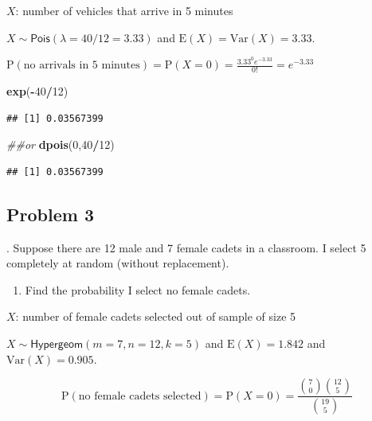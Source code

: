 \documentclass[
]{book}
\newenvironment{Shaded}{\begin{snugshade}}{\end{snugshade}}
\newcommand{\CommentTok}[1]{\textcolor[rgb]{0.56,0.35,0.01}{\textit{#1}}}
\newcommand{\DecValTok}[1]{\textcolor[rgb]{0.00,0.00,0.81}{#1}}
\newcommand{\KeywordTok}[1]{\textcolor[rgb]{0.13,0.29,0.53}{\textbf{#1}}}
\newcommand{\NormalTok}[1]{#1}
\newcommand{\OperatorTok}[1]{\textcolor[rgb]{0.81,0.36,0.00}{\textbf{#1}}}
\providecommand{\tightlist}{%
  \setlength{\itemsep}{0pt}\setlength{\parskip}{0pt}}
\begin{document}
\(X\): number of vehicles that arrive in 5 minutes

\(X\sim \textsf{Pois}(\lambda=40/12=3.33)\) and \(\mbox{E}(X)=\mbox{Var}(X)=3.33\).

\(\mbox{P}(\mbox{no arrivals in 5 minutes})=\mbox{P}(X=0)=\frac{3.33^0 e^{-3.33}}{0!}=e^{-3.33}\)

\begin{Shaded}
\begin{Highlighting}[]
\KeywordTok{exp}\NormalTok{(}\OperatorTok{-}\DecValTok{40}\OperatorTok{/}\DecValTok{12}\NormalTok{)}
\end{Highlighting}
\end{Shaded}

\begin{verbatim}
## [1] 0.03567399
\end{verbatim}

\begin{Shaded}
\begin{Highlighting}[]
\CommentTok{##or}
\KeywordTok{dpois}\NormalTok{(}\DecValTok{0}\NormalTok{,}\DecValTok{40}\OperatorTok{/}\DecValTok{12}\NormalTok{)}
\end{Highlighting}
\end{Shaded}

\begin{verbatim}
## [1] 0.03567399
\end{verbatim}

\newpage

\hypertarget{problem-3-7}{%
\subsection{Problem 3}\label{problem-3-7}}

. Suppose there are 12 male and 7 female cadets in a classroom. I select 5 completely at random (without replacement).

\begin{enumerate}
\def\labelenumi{\alph{enumi}.}
\tightlist
\item
  Find the probability I select no female cadets.
\end{enumerate}

\(X\): number of female cadets selected out of sample of size 5

\(X\sim \textsf{Hypergeom}(m=7,n=12,k=5)\) and \(\mbox{E}(X)=1.842\) and \(\mbox{Var}(X)=0.905\).

\[
\mbox{P}(\mbox{no female cadets selected})=\mbox{P}(X=0)=\frac{{7\choose 0}{12\choose 5}}{{19\choose 5}}
\]
\end{document}
